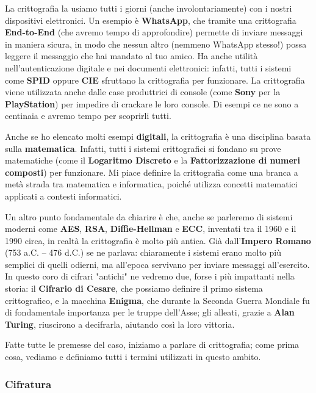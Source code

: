 \documentclass{rapport}
\begin{document}
La crittografia la usiamo tutti i giorni (anche involontariamente) con i nostri dispositivi elettronici. Un esempio è \textbf{WhatsApp}, che tramite una crittografia \textbf{End-to-End} (che avremo tempo di approfondire) permette di inviare messaggi in maniera sicura, in modo che nessun altro (nemmeno WhatsApp stesso!) possa leggere il messaggio che hai mandato al tuo amico. Ha anche utilità nell’autenticazione digitale e nei documenti elettronici: infatti, tutti i sistemi come \textbf{SPID} oppure \textbf{CIE} sfruttano la crittografia per funzionare. La crittografia viene utilizzata anche dalle case produttrici di console (come \textbf{Sony} per la \textbf{PlayStation}) per impedire di crackare le loro console. Di esempi ce ne sono a centinaia e avremo tempo per scoprirli tutti.


Anche se ho elencato molti esempi \textbf{digitali}, la crittografia è una disciplina basata sulla \textbf{matematica}. Infatti, tutti i sistemi crittografici si fondano su prove matematiche (come il \textbf{Logaritmo Discreto} e la \textbf{Fattorizzazione di numeri composti}) per funzionare. Mi piace definire la crittografia come una branca a metà strada tra matematica e informatica, poiché utilizza concetti matematici applicati a contesti informatici.

\newpage

Un altro punto fondamentale da chiarire è che, anche se parleremo di sistemi moderni come \textbf{AES}, \textbf{RSA}, \textbf{Diffie-Hellman} e \textbf{ECC}, inventati tra il 1960 e il 1990 circa, in realtà la crittografia è molto più antica. Già dall’\textbf{Impero Romano} (753 a.C. – 476 d.C.) se ne parlava: chiaramente i sistemi erano molto più semplici di quelli odierni, ma all’epoca servivano per inviare messaggi all’esercito. In questo coro di cifrari "antichi" ne vedremo due, forse i più impattanti nella storia: il \textbf{Cifrario di Cesare}, che possiamo definire il primo sistema crittografico, e la macchina \textbf{Enigma}, che durante la Seconda Guerra Mondiale fu di fondamentale importanza per le truppe dell’Asse; gli alleati, grazie a \textbf{Alan Turing}, riuscirono a decifrarla, aiutando così la loro vittoria.

Fatte tutte le premesse del caso, iniziamo a parlare di crittografia; come prima cosa, vediamo e definiamo tutti i termini utilizzati in questo ambito.


\subsubsection{Cifratura} 
\end{document}
